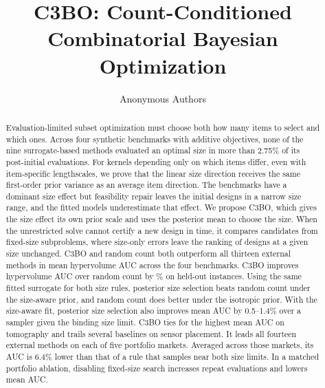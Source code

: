 \documentclass{article}
\title{C3BO: Count-Conditioned Combinatorial Bayesian Optimization}
\author{Anonymous Authors}
\newcommand{\revtext}[1]{{\color{blue}#1}}
\theoremstyle{remark}\newtheorem{remark}[proposition]{Remark}
\begin{document}
\raggedbottom
\maketitle
{}

\begin{abstract}
Evaluation-limited subset optimization must choose both how many items to select and which ones.
Across four \revtext{synthetic} benchmarks with additive objectives, \revtext{none of} the nine surrogate-based methods \revtext{evaluated an optimal size in more than 2.75\% of its post-initial evaluations}.
For kernels depending only on which items differ, \revtext{even with item-specific lengthscales}, we prove that the linear size direction receives \revtext{the same first-order prior variance as an average item direction}.
The benchmarks have a dominant size effect \revtext{but feasibility repair leaves the initial designs in a narrow size range, and the fitted models} underestimate that effect.
We propose C3BO, which \revtext{gives the size effect its own prior scale and uses the posterior mean to choose the size}.
When the \revtext{unrestricted solve cannot certify a new design} in time, it compares candidates from \revtext{fixed-size} subproblems, where size-only errors leave \revtext{the ranking of designs at a given size} unchanged.
\revtext{C3BO and random count} both outperform all thirteen external methods \revtext{in mean hypervolume AUC} across the four benchmarks.
C3BO improves hypervolume AUC over \revtext{random count} by \hvGainHeldIsh\% on held-out instances.
\revtext{Using the same fitted surrogate for both size rules, posterior size selection beats random count under the size-aware prior, and random count does better under the isotropic prior.
With the size-aware fit, posterior size selection also improves mean AUC by 0.5--1.4\% over a sampler given the binding size limit.}
\revtext{C3BO ties for the highest mean AUC on tomography and trails several baselines on sensor placement.
It leads all fourteen external methods on each of five portfolio markets.
Averaged across those markets, its AUC is 6.4\% lower than that of a rule that samples near both size limits.
In a matched portfolio ablation, disabling fixed-size search increases repeat evaluations and lowers mean AUC.}
\end{abstract}

\end{document}
